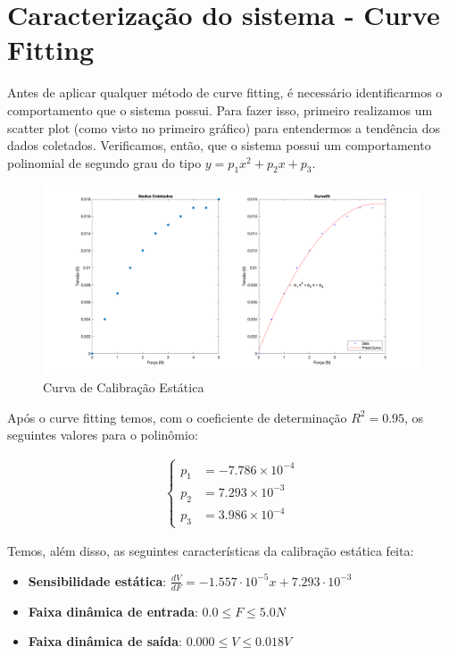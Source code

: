 \documentclass{article}
\begin{document}
\section*{Caracterização do sistema - Curve Fitting}
    Antes de aplicar qualquer método de curve fitting, é necessário identificarmos o comportamento que o sistema possui. Para fazer isso, primeiro realizamos um scatter plot (como visto no primeiro gráfico) para entendermos a tendência dos dados coletados. 
    Verificamos, então, que o sistema possui um comportamento polinomial de segundo grau do tipo $y=p_1x^2+p_2x+p_3$.
    \begin{figure}[h!]
        \centering
        \includegraphics[width=\linewidth]{curve_fitting.png}
        \caption{Curva de Calibração Estática}
        \label{fig:curv_calib}
    \end{figure}

    Após o curve fitting temos, com o coeficiente de determinação $R^2 = 0.95$, os seguintes valores para o polinômio:
    
    \begin{align*}
        \begin{cases}
            p_1 &= -7.786 \times 10^{-4} \\ 
            p_2 &= 7.293 \times 10^{-3} \\
            p_3 &= 3.986 \times 10^{-4}
        \end{cases}
    \end{align*}

    Temos, além disso, as seguintes características da calibração estática feita:
    
    \begin{itemize}
        \item \textbf{Sensibilidade estática}: $\frac{dV}{dF}=-1.557\cdot 10^{-5}x+7.293\cdot 10^{-3}$
        \item \textbf{Faixa dinâmica de entrada}: $0.0\leq F \leq 5.0N$
        \item \textbf{Faixa dinâmica de saída}: $0.000\leq V \leq 0.018V$
    \end{itemize}
\end{document}

